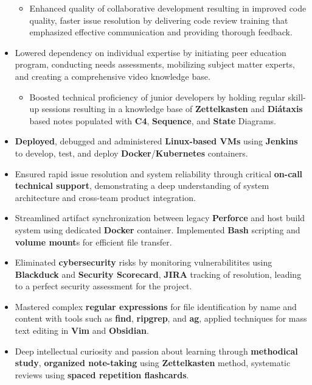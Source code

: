 \documentclass[a4paper]{article}
\begin{document}
\begin{itemize}
\begin{itemize}
	    \item Enhanced quality of collaborative development resulting in improved code quality, faster issue resolution by delivering code review training that emphasized effective communication and providing thorough feedback.
    \end{itemize}
	\item Lowered dependency on individual expertise by initiating peer education program, conducting needs assessments, mobilizing subject matter experts, and creating a comprehensive video knowledge base.
    \begin{itemize}
	    \item Boosted technical proficiency of junior developers by holding regular skill-up sessions resulting in a knowledge base of \textbf{Zettelkasten} and \textbf{Diátaxis} based notes populated with \textbf{C4}, \textbf{Sequence}, and \textbf{State} Diagrams.
    \end{itemize}
	\item \textbf{Deployed}, debugged and administered \textbf{Linux-based VMs} using \textbf{Jenkins} to develop, test, and deploy \textbf{Docker}/\textbf{Kubernetes} containers.
	\item Ensured rapid issue resolution and system reliability through critical \textbf{on-call technical support}, demonstrating a deep understanding of system architecture and cross-team product integration.
	\item Streamlined artifact synchronization between legacy \textbf{Perforce} and host build system using dedicated \textbf{Docker} container. Implemented \textbf{Bash} scripting and \textbf{volume mount}s for efficient file transfer.
	\item Eliminated \textbf{cybersecurity} risks by monitoring vulnerabilitites using \textbf{Blackduck} and \textbf{Security Scorecard}, \textbf{JIRA} tracking of resolution, leading to a perfect security assessment for the project.
	\item Mastered complex \textbf{regular expressions} for file identification by name and content with tools such as \textbf{find}, \textbf{ripgrep}, and \textbf{ag}, applied techniques for mass text editing in \textbf{Vim} and \textbf{Obsidian}.
	\item Deep intellectual curiosity and passion about learning through \textbf{methodical study}, \textbf{organized note-taking} using \textbf{Zettelkasten} method, systematic reviews using \textbf{spaced repetition flashcards}.
\end{itemize}
\end{document}

